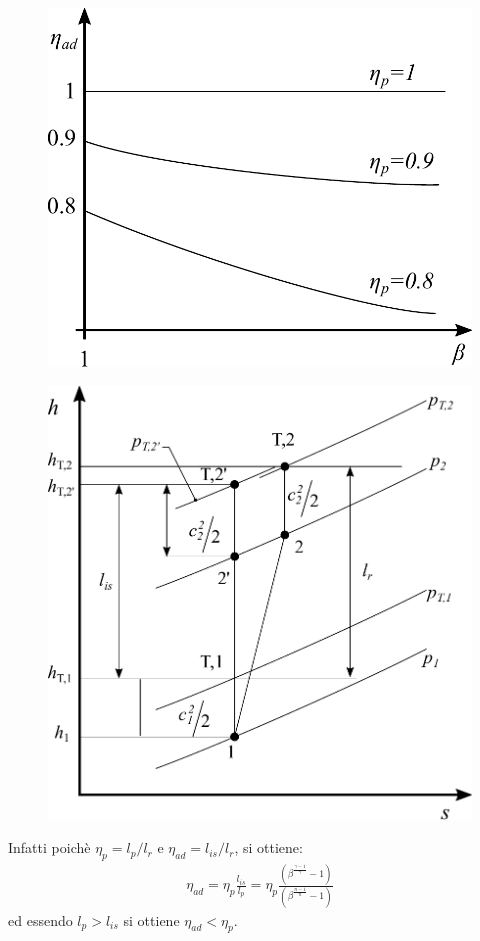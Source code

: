 \begin{figure}
\centering
\begin{minipage}{.45\textwidth}
  \centering
  \includegraphics[width=.9\linewidth]{fig/Rend3.pdf}
  \label{fig:Rend3}
\end{minipage}%
\begin{minipage}{.55\textwidth}
  \centering
  \includegraphics[width=.9\linewidth]{fig/Rend4.pdf}
  \label{fig:Rend4}
\end{minipage}
\end{figure}
Infatti poichè $\eta_p = l_p / l_r$ e $\eta_{ad} = l_{is} / l_r$, si ottiene:
\begin{align*}
\eta_{ad} = \eta_p \frac{l_{is}}{l_p} = \eta_p \frac{\left(\beta^{\frac{\gamma -1}{\gamma}}-1 \right)}{\left(\beta^{\frac{n -1}{n}}-1 \right)}
\end{align*}
ed essendo $l_p > l_{is}$ si ottiene $\eta_{ad} < \eta_p$.

